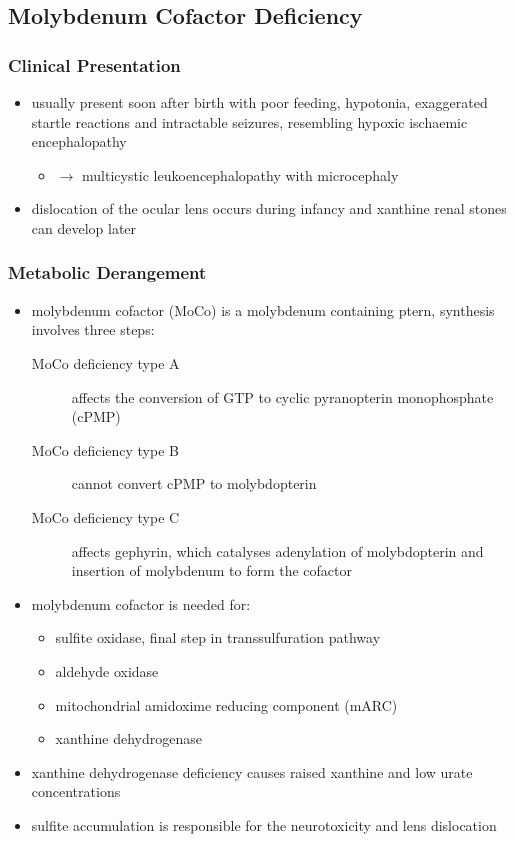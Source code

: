 \documentclass[12pt]{scrartcl}
\begin{document}
\begin{center}
\begin{center}
\subsection{Molybdenum Cofactor Deficiency}
\label{sec:org86e84ee}
\subsubsection{Clinical Presentation}
\label{sec:org4ff6704}
\begin{itemize}
\item usually present soon after birth with poor feeding, hypotonia,
exaggerated startle reactions and intractable seizures, resembling
hypoxic ischaemic encephalopathy
\begin{itemize}
\item \(\to\) multicystic leukoencephalopathy with microcephaly
\end{itemize}
\item dislocation of the ocular lens occurs during infancy and xanthine
renal stones can develop later
\end{itemize}

\subsubsection{Metabolic Derangement}
\label{sec:orgdc30d3a}
\begin{itemize}
\item molybdenum cofactor (MoCo) is a molybdenum containing ptern,
synthesis involves three steps:
\begin{description}
\item[{MoCo deficiency type A}] affects the conversion of GTP to cyclic
pyranopterin monophosphate (cPMP)
\item[{MoCo deficiency type B}] cannot convert cPMP to molybdopterin
\item[{MoCo deficiency type C}] affects gephyrin, which catalyses
adenylation of molybdopterin and insertion of molybdenum to
form the cofactor
\end{description}
\item molybdenum cofactor is needed for:
\begin{itemize}
\item sulfite oxidase, final step in transsulfuration pathway
\item aldehyde oxidase
\item mitochondrial amidoxime reducing component (mARC)
\item xanthine dehydrogenase
\end{itemize}
\item xanthine dehydrogenase deficiency causes raised xanthine and low
urate concentrations
\item sulfite accumulation is responsible for the neurotoxicity and lens
dislocation
\end{itemize}


\end{center}
\end{center}
\end{document}
